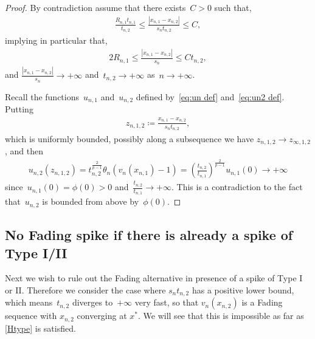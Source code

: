 \documentclass[10pt]{amsart}
\newcommand{\parenthesis}[1]{\left(#1\right)} %
\renewcommand{\to}{\rightarrow}
\begin{document}
    \begin{proof}
        By contradiction assume that there exists~$C>0$ such that,
        \begin{align*}
            \frac{R_{n,1} t_{n,1}}{t_{n,2}}\leq \frac{|x_{n,1}-x_{n,2}|}{s_n t_{n,2}}\leq C,
        \end{align*}
        implying in particular that,
        \begin{align*}
          2R_{n,1}\leq \frac{|x_{n,1}-x_{n,2}|}{s_n} \leq C t_{n,2},
        \end{align*}
        and $\frac{|x_{n,1}-x_{n,2}|}{s_n}\to +\infty$ and~$t_{n,2}\to +\infty$ as~$n\to +\infty$.

        Recall the functions~$u_{n,1}$ and~$u_{n,2}$ defined by~\eqref{eq:un def} and~\eqref{eq:un2 def}.
        Putting
        \begin{align*}
            z_{n,1,2}\coloneqq \frac{x_{n,1} -x_{n,2}}{s_n t_{n,2}},
        \end{align*}
        which is uniformly bounded, possibly along a subsequence we have $z_{n,1, 2}\to z_{\infty,1,2}$, and then
        \begin{align*}
            u_{n,2}(z_{n,1,2})= t_{n,2}^{\frac{2}{p-1}}\theta_n\parenthesis{ v_n(x_{n,1} )-1}= \parenthesis{\frac{t_{n,2}}{t_{n,1}}}^{\frac{2}{p-1}} u_{n,1}(0)\to +\infty
        \end{align*}
        since~$u_{n,1}(0)=\phi(0)>0$ and~$\frac{t_{n,2}}{t_{n,1}}\to +\infty$.
        This is a contradiction to the fact that~$u_{n,2}$ is bounded from above by~$\phi(0)$.
    \end{proof}

\medskip

\subsection{No Fading spike if there is already a spike of Type I/II}\label{subs:5.2}
Next we wish to rule out the Fading alternative in presence of a spike of Type I or II. Therefore we consider the case where $s_n t_{n,2}$ has a positive lower bound,
which means~$t_{n,2}$ diverges to~$+\infty$ very fast, so that $v_n(x_{n,2})$ is a Fading sequence with $x_{n,2}$ converging at $x^*$.
We will see that this is impossible
as far as \eqref{Htype} is satisfied.

\medskip
\end{document}
